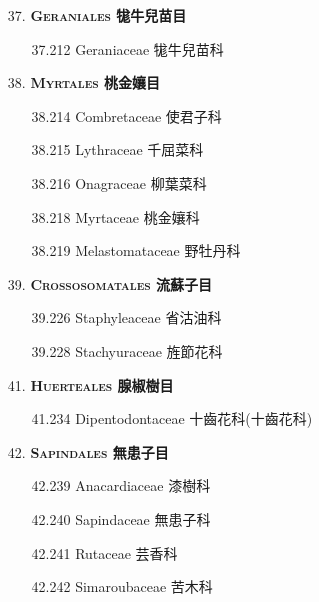 \begin{enumerate}
  \item[37. ] \textbf{\textsc{Geraniales} 牻牛兒苗目} 
    \begin{enumerate}
      \item[37.212] Geraniaceae 牻牛兒苗科  
        
    \end{enumerate}
  \item[38. ] \textbf{\textsc{Myrtales} 桃金孃目} 
    \begin{enumerate}
      \item[38.214] Combretaceae 使君子科  
        
      \item[38.215] Lythraceae 千屈菜科  
        
      \item[38.216] Onagraceae 柳葉菜科  
        
      \item[38.218] Myrtaceae 桃金孃科  
        
      \item[38.219] Melastomataceae 野牡丹科  
        
    \end{enumerate}
  \item[39. ] \textbf{\textsc{Crossosomatales} 流蘇子目} 
    \begin{enumerate}
      \item[39.226] Staphyleaceae 省沽油科  
        
      \item[39.228] Stachyuraceae 旌節花科  
        
    \end{enumerate}
  \item[41. ] \textbf{\textsc{Huerteales} 腺椒樹目} 
    \begin{enumerate}
      \item[41.234] Dipentodontaceae 十齒花科(十齒花科)  
        
    \end{enumerate}
  \item[42. ] \textbf{\textsc{Sapindales} 無患子目} 
    \begin{enumerate}
      \item[42.239] Anacardiaceae 漆樹科  
        
      \item[42.240] Sapindaceae 無患子科  
        
      \item[42.241] Rutaceae 芸香科  
        
      \item[42.242] Simaroubaceae 苦木科  
        

\end{enumerate}
\end{enumerate}
